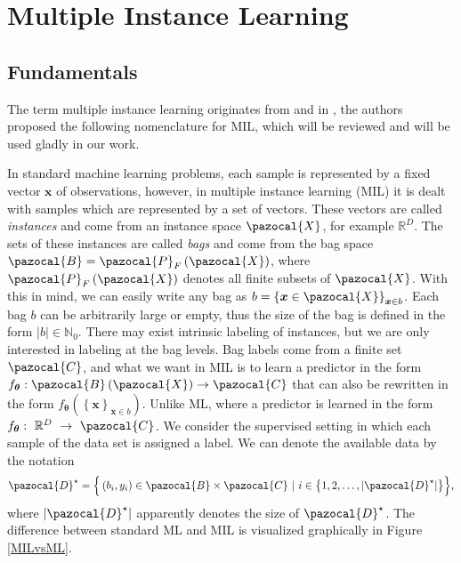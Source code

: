 \chapter{Multiple Instance Learning}
\section{Fundamentals}
The term multiple instance learning originates from \cite{MILfirstly} and in \cite{mandlik}, the authors proposed the following nomenclature for MIL, which will be reviewed and will be used gladly in our work. 

In standard machine learning problems, each sample is represented by a fixed vector $\boldsymbol{x}$ of observations, however, in multiple instance learning (MIL) it is dealt with samples which are represented by a set of vectors. These vectors are called \emph{instances} and come from an instance space $\pazocal{X}$, for example $\mathbb{R}^D$. The sets of these instances are called \emph{bags} and come from the bag space $\pazocal{B} = \pazocal{P}_F\left(\pazocal{X}\right)$, where $\pazocal{P}_F\left(\pazocal{X}\right)$ denotes all finite subsets of $\pazocal{X}$. With this in mind, we can easily write any bag as $b = \left\lbrace \boldsymbol{x} \in  \pazocal{X} \right\rbrace_{\boldsymbol{x} \in b}$. Each bag $b$ can be arbitrarily large or empty, thus the size of the bag is defined in the form $\vert b\vert \in \mathbb{N}_0$. There may exist intrinsic labeling of instances, but we are only interested in labeling at the bag levels. Bag labels come from a finite set $\pazocal{C}$, and what we want in MIL is to learn a predictor in the form $f_{\boldsymbol{\theta}}: \pazocal{B}\left(\pazocal{X}\right) \rightarrow \pazocal{C}$ that can also be rewritten in the form $f_{\boldsymbol{\theta}}\left(\left\lbrace \boldsymbol{x}\right\rbrace_{\boldsymbol{x}\in b}\right)$. Unlike ML, where a predictor is learned in the form $f_{\boldsymbol{\theta}}:~\mathbb{R}^D~\rightarrow~\pazocal{C}$.  We consider the supervised setting in which each sample of the data set is assigned a label. We can denote the available data by the notation 
\begin{equation}
\pazocal{D}^\star = \Big\lbrace \left(b_i, y_i\right) \in \pazocal{B}\times\pazocal{C} \ | \ i \in \big\lbrace 1,2,\dots,\vert \pazocal{D}^\star \vert \big\rbrace \Big\rbrace, 
\end{equation}
where $\vert \pazocal{D}^\star \vert$ apparently denotes the size of $\pazocal{D}^\star$. The difference between standard ML and MIL is visualized graphically in Figure \ref{MILvsML}.
